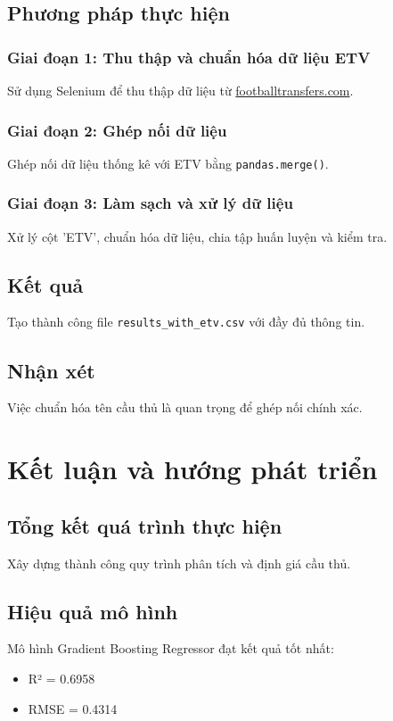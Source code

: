 \documentclass[12pt,a4paper]{article}
\begin{document}
\subsection{Phương pháp thực hiện}

\subsubsection{Giai đoạn 1: Thu thập và chuẩn hóa dữ liệu ETV}
Sử dụng Selenium để thu thập dữ liệu từ \url{footballtransfers.com}.

\subsubsection{Giai đoạn 2: Ghép nối dữ liệu}
Ghép nối dữ liệu thống kê với ETV bằng \texttt{pandas.merge()}.

\subsubsection{Giai đoạn 3: Làm sạch và xử lý dữ liệu}
Xử lý cột 'ETV', chuẩn hóa dữ liệu, chia tập huấn luyện và kiểm tra.

\subsection{Kết quả}
Tạo thành công file \texttt{results\_with\_etv.csv} với đầy đủ thông tin.

\subsection{Nhận xét}
Việc chuẩn hóa tên cầu thủ là quan trọng để ghép nối chính xác.

\section{Kết luận và hướng phát triển}

\subsection{Tổng kết quá trình thực hiện}
Xây dựng thành công quy trình phân tích và định giá cầu thủ.

\subsection{Hiệu quả mô hình}
Mô hình Gradient Boosting Regressor đạt kết quả tốt nhất:
\begin{itemize}
\item R² = 0.6958
\item RMSE = 0.4314
\end{itemize}
\end{document}
